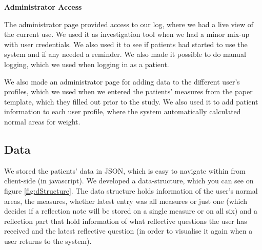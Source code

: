 \textbf{Administrator Access}

The administrator page provided access to our log, where we had a live view of the current use. We used it as investigation tool when we had a minor mix-up with user credentials. We also used it to see if patients had started to use the system and if any needed a reminder. We also made it possible to do manual logging, which we used when logging in as a patient.

We also made an administrator page for adding data to the different user's profiles, which we used when we entered the patients' measures from the paper template, which they filled out prior to the study. We also used it to add patient information to each user profile, where the system automatically calculated normal areas for weight. 


\subsection{Data}
We stored the patients' data in JSON, which is easy to navigate within from client-side (in javascript). We developed a data-structure, which you can see on figure \ref{fig:dStructure}. The data structure holds information of the user's normal areas, the measures, whether latest entry was all measures or just one (which decides if a reflection note will be stored on a single measure or on all six) and a reflection part that hold information of what reflective questions the user has received and the latest reflective question (in order to visualise it again when a user returns to the system).

